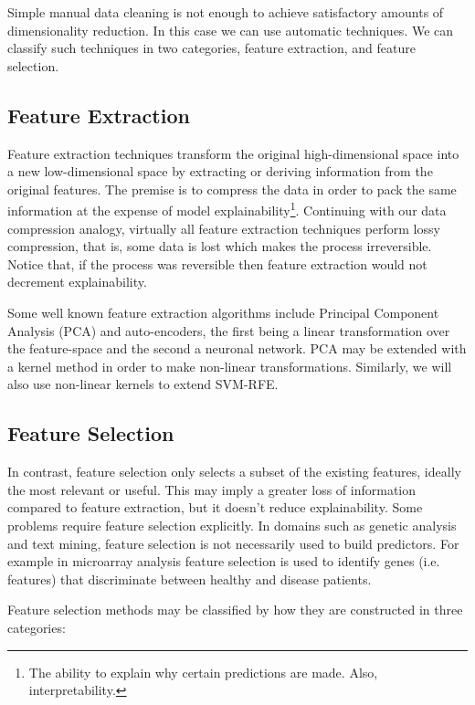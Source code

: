 Simple manual data cleaning is not enough to achieve satisfactory amounts of dimensionality reduction. In this case we can use automatic techniques. We can classify such techniques in two categories, feature extraction, and feature selection.

\subsection{Feature Extraction}

Feature extraction techniques transform the original high-dimensional space into a new low-dimensional space by extracting or deriving information from the original features. The premise is to compress the data in order to pack the same information at the expense of model explainability\footnote{The ability to explain why certain predictions are made. Also, interpretability.}. Continuing with our data compression analogy, virtually all feature extraction techniques perform lossy com\-pres\-sion, that is, some data is lost which makes the process irreversible. Notice that, if the process was reversible then feature extraction would not decrement explainability.

Some well known feature extraction algorithms include Principal Component Analysis (PCA) and auto-encoders, the first being a linear transformation over the feature-space and the second a neuronal network. PCA may be extended with a kernel method in order to make non-linear transformations. Similarly, we will also use non-linear kernels to extend SVM-RFE.

\subsection{Feature Selection}
\label{sec:ch1.feature_selection}

In contrast, feature selection only selects a subset of the existing features, ideally the most relevant or useful. This may imply a greater loss of information compared to feature extraction, but it doesn't reduce explainability. Some problems require feature selection explicitly. In domains such as genetic analysis and text mining, feature selection is not necessarily used to build predictors. For example in micro\-array analysis feature selection is used to identify genes (i.e. features) that dis\-criminate between healthy and disease patients. 

Feature selection methods may be classified by how they are constructed in three categories:

